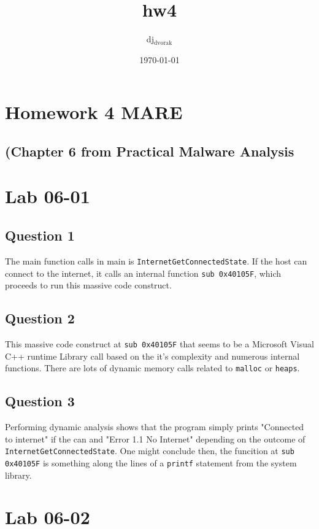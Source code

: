 \documentclass[11pt]{article}
\author{dj$_{\text{dvorak}}$}
\date{\today}
\title{hw4}
\begin{document}
\maketitle
\tableofcontents

\section{Homework 4 MARE}
\label{sec-1}
\subsection{(Chapter 6 from Practical Malware Analysis}
\label{sec-1-1}



\section{Lab 06-01}
\label{sec-2}

\subsection{Question 1}
\label{sec-2-1}

The main function calls in main is \texttt{InternetGetConnectedState}.
If the host can connect to the internet, it calls an internal function
\texttt{sub 0x40105F}, which proceeds to run this massive code construct.

\subsection{Question 2}
\label{sec-2-2}
This massive code construct at \texttt{sub 0x40105F} that seems to be a Microsoft
Visual C++ runtime Library call based on the it's complexity and numerous
internal functions. There are lots of dynamic memory calls related to
\texttt{malloc} or \texttt{heaps}.  
\subsection{Question 3}
\label{sec-2-3}
Performing dynamic analysis shows that the program simply prints "Connected
to internet" if the can and "Error 1.1 No Internet" depending on the outcome
of \texttt{InternetGetConnectedState}. One might conclude then, the funcition at
\texttt{sub 0x40105F} is something along the lines of a \texttt{printf} statement from the
system library.

\section{Lab 06-02}
\label{sec-3}
\end{document}
